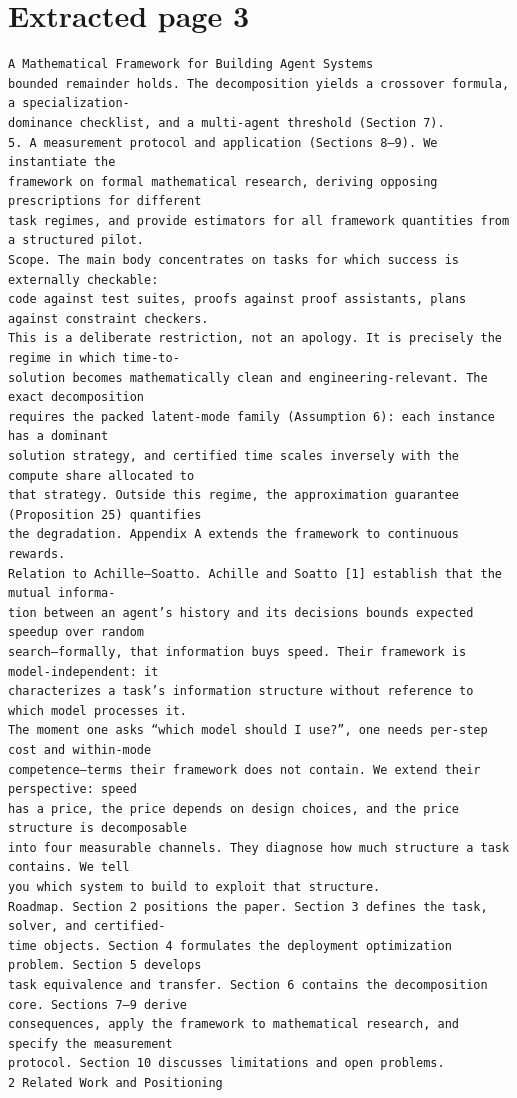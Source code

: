 \documentclass[11pt]{article}
\begin{document}
\section*{Extracted page 3}
\begin{verbatim}
A Mathematical Framework for Building Agent Systems
bounded remainder holds. The decomposition yields a crossover formula, a specialization-
dominance checklist, and a multi-agent threshold (Section 7).
5. A measurement protocol and application (Sections 8–9). We instantiate the
framework on formal mathematical research, deriving opposing prescriptions for different
task regimes, and provide estimators for all framework quantities from a structured pilot.
Scope. The main body concentrates on tasks for which success is externally checkable:
code against test suites, proofs against proof assistants, plans against constraint checkers.
This is a deliberate restriction, not an apology. It is precisely the regime in which time-to-
solution becomes mathematically clean and engineering-relevant. The exact decomposition
requires the packed latent-mode family (Assumption 6): each instance has a dominant
solution strategy, and certified time scales inversely with the compute share allocated to
that strategy. Outside this regime, the approximation guarantee (Proposition 25) quantifies
the degradation. Appendix A extends the framework to continuous rewards.
Relation to Achille–Soatto. Achille and Soatto [1] establish that the mutual informa-
tion between an agent’s history and its decisions bounds expected speedup over random
search—formally, that information buys speed. Their framework is model-independent: it
characterizes a task’s information structure without reference to which model processes it.
The moment one asks “which model should I use?”, one needs per-step cost and within-mode
competence—terms their framework does not contain. We extend their perspective: speed
has a price, the price depends on design choices, and the price structure is decomposable
into four measurable channels. They diagnose how much structure a task contains. We tell
you which system to build to exploit that structure.
Roadmap. Section 2 positions the paper. Section 3 defines the task, solver, and certified-
time objects. Section 4 formulates the deployment optimization problem. Section 5 develops
task equivalence and transfer. Section 6 contains the decomposition core. Sections 7–9 derive
consequences, apply the framework to mathematical research, and specify the measurement
protocol. Section 10 discusses limitations and open problems.
2 Related Work and Positioning

\end{verbatim}
\end{document}
